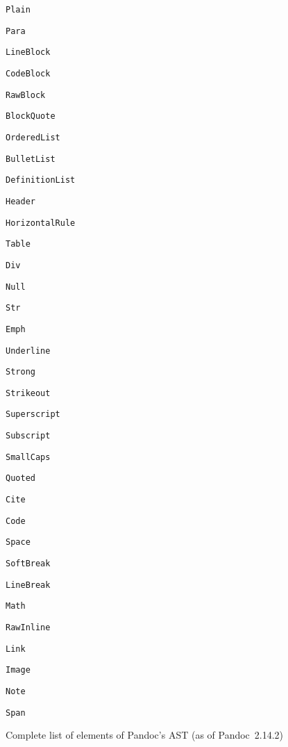 \documentclass[
  digital,     %
  oneside,     %
  nosansbold,  %
  nocolorbold, %
  lof,         %
  nolot,       %
]{fithesis4}
\begin{document}
\begin{figure}
  \centering
  \begin{multicols}{3}
    \begin{compactenum}
      \item \texttt{Plain}
      \item \texttt{Para}
      \item \texttt{LineBlock}
      \item \texttt{CodeBlock}
      \item \texttt{RawBlock}
      \item \texttt{BlockQuote}
      \item \texttt{OrderedList}
      \item \texttt{BulletList}
      \item \texttt{DefinitionList}
      \item \texttt{Header}
      \item \texttt{HorizontalRule}
      \item \texttt{Table}
      \item \texttt{Div}
      \item \texttt{Null}
      \item \texttt{Str}
      \item \texttt{Emph}
      \item \texttt{Underline}
      \item \texttt{Strong}
      \item \texttt{Strikeout}
      \item \texttt{Superscript}
      \item \texttt{Subscript}
      \item \texttt{SmallCaps}
      \item \texttt{Quoted}
      \item \texttt{Cite}
      \item \texttt{Code}
      \item \texttt{Space}
      \item \texttt{SoftBreak}
      \item \texttt{LineBreak}
      \item \texttt{Math}
      \item \texttt{RawInline}
      \item \texttt{Link}
      \item \texttt{Image}
      \item \texttt{Note}
      \item \texttt{Span}
    \end{compactenum}
  \end{multicols}
  \vspace*{-1em}
  \caption{Complete list of elements of Pandoc's AST (as of Pandoc~2.14.2)}
  \label{fig:pandoc-elems}
\end{figure}
\end{document}

